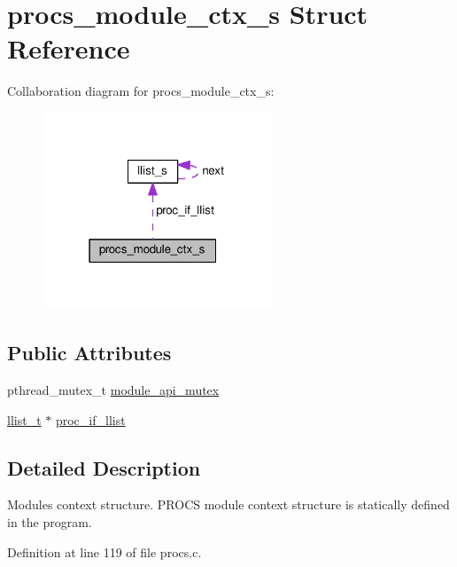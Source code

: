 \hypertarget{structprocs__module__ctx__s}{}\section{procs\+\_\+module\+\_\+ctx\+\_\+s Struct Reference}
\label{structprocs__module__ctx__s}


Collaboration diagram for procs\+\_\+module\+\_\+ctx\+\_\+s\+:\nopagebreak
\begin{figure}[H]
\begin{center}
\leavevmode
\includegraphics[width=195pt]{structprocs__module__ctx__s__coll__graph}
\end{center}
\end{figure}
\subsection*{Public Attributes}
\begin{DoxyCompactItemize}
\item 
pthread\+\_\+mutex\+\_\+t \hyperlink{structprocs__module__ctx__s_a10c3a0b462ead663af1b117abdfdadaa}{module\+\_\+api\+\_\+mutex}
\item 
\hyperlink{llist_8h_a90862badf6f9cc4e3d6348b7d60ce4f0}{llist\+\_\+t} $\ast$ \hyperlink{structprocs__module__ctx__s_a8a7a2cc3f2ee076ae11b7fdc63645f41}{proc\+\_\+if\+\_\+llist}
\end{DoxyCompactItemize}


\subsection{Detailed Description}
Module\textquotesingle{}s context structure. P\+R\+O\+CS module context structure is statically defined in the program. 

Definition at line 119 of file procs.\+c.



